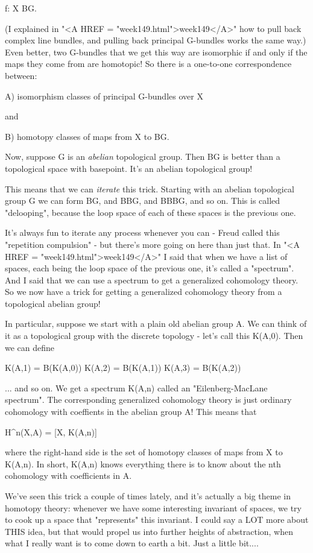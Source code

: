 f: X \to  BG.

(I explained in "<A HREF = "week149.html">week149</A>" how to pull back complex line bundles, and
pulling back principal G-bundles works the same way.)   Even better, 
two G-bundles that we get this way are isomorphic if and only if the maps
they come from are homotopic!  So there is a one-to-one correspondence
between:

A) isomorphism classes of principal G-bundles over X 

and

B) homotopy classes of maps from X to BG.

Now, suppose G is an \emph{abelian} topological group.  Then BG is better
than a topological space with basepoint.  It's an abelian topological
group!  

This means that we can \emph{iterate} this trick.   Starting with an abelian
topological group G we can form BG, and BBG, and BBBG, and so on.   This 
is called "delooping", because the loop space of each of these spaces is 
the previous one.   

It's always fun to iterate any process whenever you can - Freud called
this "repetition compulsion" - but there's more going on here than just
that.  In "<A HREF = "week149.html">week149</A>" I said that when we have a list of spaces, each being
the loop space of the previous one, it's called a "spectrum".  And I
said that we can use a spectrum to get a generalized cohomology theory. 
So we now have a trick for getting a generalized cohomology theory from
a topological abelian group!

In particular, suppose we start with a plain old abelian group A.  
We can think of it as a topological group with the discrete topology - 
let's call this K(A,0).  Then we can define

K(A,1) = B(K(A,0))
K(A,2) = B(K(A,1))
K(A,3) = B(K(A,2)) 
    
... and so on.   We get a spectrum K(A,n) called an "Eilenberg-MacLane
spectrum".  The corresponding generalized cohomology theory is just
ordinary cohomology with coeffients in the abelian group A!  This means
that

H^{n}(X,A) = [X, K(A,n)]

where the right-hand side is the set of homotopy classes of maps from X
to K(A,n).  In short, K(A,n) knows everything there is to know about the
nth cohomology with coefficients in A.  

We've seen this trick a couple of times lately, and it's actually a big
theme in homotopy theory: whenever we have some interesting invariant of
spaces, we try to cook up a space that "represents" this invariant.  I
could say a LOT more about THIS idea, but that would propel us into
further heights of abstraction, when what I really want is to come down 
to earth a bit.  Just a little bit.... 

